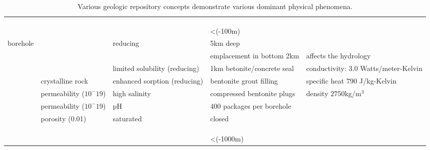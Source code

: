 \begin{table}[h!]
{\begin{tabularx}{\textwidth}{|l|X|X|X|X|}
    &&&&\\
    &&&&\\
    &&&&\\
    &&&<(-100m)&\\
    borehole&&reducing&5km deep&\\
    &&&emplacement in bottom 2km&affects the hydrology\\
    &&limited solubility (reducing)&1km betonite/concrete seal &conductivity: 3.0 Watts/meter-Kelvin\\
    &crystalline rock&enhanced sorption (reducing)&bentonite grout filling&specific heat 790 J/kg-Kelvin\\
    &permeability ($10^-19$)&high salinity&compressed bentonite plugs&density $2750 $kg/m$^3$\\
    &permeability ($10^-19$)&pH&400 packages per borehole&\\
    &porosity (0.01)&saturated&closed&\\
    &&&&\\
    &&&&\\
    &&&&\\
    &&&<(-1000m)&\\
    \hline
  \end{tabularx}
  \caption[Distinguishing phenomena of candidate geologic media.]{Various geologic repository concepts demonstrate various dominant physical phenomena. }
  \label{tab:phenom_tab}
  }
\end{table}


